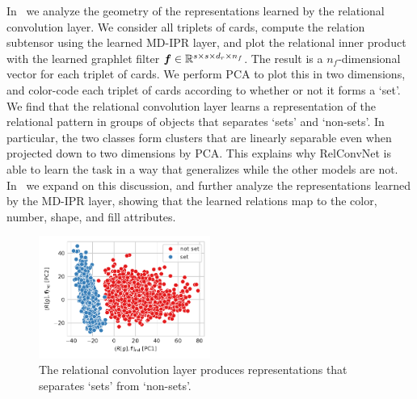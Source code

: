 In~ we analyze the geometry of the representations learned by the relational convolution layer. We consider all triplets of cards, compute the relation subtensor using the learned MD-IPR layer, and plot the relational inner product with the learned graphlet filter $\bm{f} \in \mathbb{R}^{s \times s \times d_r \times n_f}$. The result is a $n_f$-dimensional vector for each triplet of cards. We perform PCA to plot this in two dimensions, and color-code each triplet of cards according to whether or not it forms a `set'. We find that the relational convolution layer learns a representation of the relational pattern in groups of objects that separates `sets' and `non-sets'. In particular, the two classes form clusters that are linearly separable even when projected down to two dimensions by PCA. This explains why RelConvNet is able to learn the task in a way that generalizes while the other models are not. In~ we expand on this discussion, and further analyze the representations learned by the MD-IPR layer, showing that the learned relations map to the color, number, shape, and fill attributes.

\begin{figure}
    \centering
    \includegraphics[width=0.5\textwidth]{figs/representation_analysis/conv_rep.pdf}
    \caption{The relational convolution layer produces representations that separates `sets' from `non-sets'.}\label{fig:conv_rep}
\end{figure}

